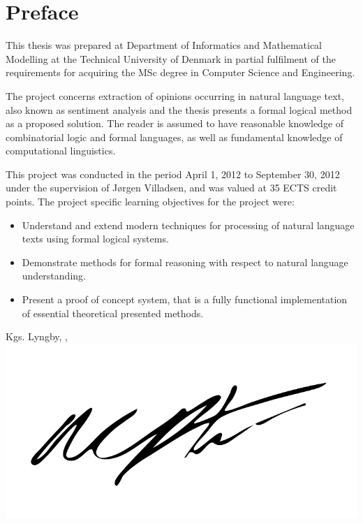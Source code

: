 
\chapter{Preface}
\vspace{-1em}

This thesis was prepared at Department of Informatics and Mathematical Modelling at the Technical University of Denmark in partial fulfilment of the
requirements for acquiring the MSc degree in Computer Science and Engineering. 

The project concerns extraction of opinions occurring in natural language text, also known as sentiment analysis and the thesis presents a formal logical method as a proposed solution. The reader is assumed to have reasonable knowledge of combinatorial  logic and formal languages, as well as fundamental knowledge of computational linguistics. 

This project was conducted in the period April 1, 2012 to September 30, 2012 under the supervision of Jørgen Villadsen, and was valued at 35 ECTS credit points. The project specific learning objectives for the project were:

\begin{minipage}{.8\textwidth}
\it
\begin{itemize}
	\item Understand and extend modern techniques for processing of natural language texts using formal logical systems.
	\item Demonstrate methods for formal reasoning with respect to natural language understanding.
	\item Present a proof of concept system, that is a fully functional implementation of essential theoretical presented methods.
\end{itemize}
\end{minipage}
\vfill
\begin{flushright}
 	Kgs. Lyngby, \thesishandin, \thesisyear\\
	\includegraphics[scale=0.3]{Figures/Signature}\\[-1.5em]
	\thesisauthor
\end{flushright}
\vspace{-3em}